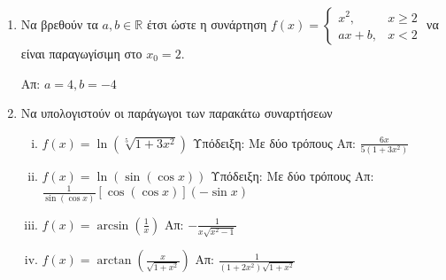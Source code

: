 \documentclass[a4paper,table]{report}
\begin{document}
\begin{center}
  \minibox{\large \bfseries \textcolor{Col1}{Ασκήσεις στις Παραγώγους}}
\end{center}


\begin{enumerate}

  \subsection*{Παράγωγος}



  \item Να βρεθούν τα $ a, b \in \mathbb{R} $ έτσι ώστε η συνάρτηση 
    $
    f(x) = \begin{cases}
      x^{2}, & x\geq 2 \\
      ax+b , & x<2
    \end{cases}
    $
    να είναι παραγωγίσιμη στο $ x_{0} = 2 $.

    \hfill Απ: $ a=4, b=-4 $

  \item Να υπολογιστούν οι παράγωγοι των παρακάτω συναρτήσεων
    \begin{enumerate}[(i)]
      \item $ f(x) = \ln{\left(\sqrt[5]{1+3x^{2}}\right)} $ 
        \; \textcolor{Col1}{Υπόδειξη:} Με δύο τρόπους  
        \hfill Απ: $ \frac{6x}{5(1+3x^{2})} $
      \item $ f(x) = \ln({\sin({\cos{x}})}) $ 
      \; \textcolor{Col1}{Υπόδειξη:} Με δύο τρόπους
        \hfill Απ: $ \frac{1}{\sin{(\cos{x})}} [\cos{(\cos{x})}] (- \sin{x}) $ 
      \item $ f(x)= \arcsin(\frac{1}{x}) $ \hfill Απ: $ - \frac{1}{x \sqrt{x^{2}-1}} $ 
      \item $ f(x) = \arctan \left(\frac{x}{\sqrt{1 + x^{2}}}\right) $ \hfill Απ: $
        \frac{1}{(1+2x^{2})\sqrt{1 + x^{2}}} $
    \end{enumerate}


\end{enumerate}
\end{document}
